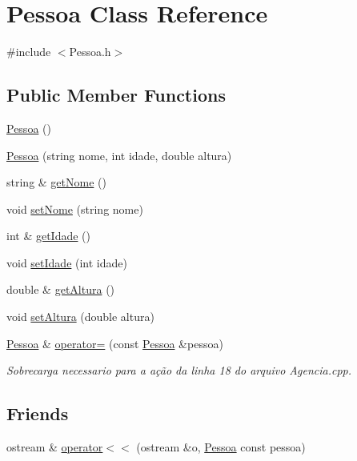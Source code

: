 \hypertarget{classPessoa}{}\section{Pessoa Class Reference}
\label{classPessoa}


{\ttfamily \#include $<$Pessoa.\+h$>$}

\subsection*{Public Member Functions}
\begin{DoxyCompactItemize}
\item 
\hyperlink{classPessoa_a22563fe1f53faa9b1d8d10d28ae0c650}{Pessoa} ()
\item 
\hyperlink{classPessoa_aba44d36855c8ba8f99841bb91feebffd}{Pessoa} (string nome, int idade, double altura)
\item 
string \& \hyperlink{classPessoa_aecf4c8687a96428f134baff162ffd252}{get\+Nome} ()
\item 
void \hyperlink{classPessoa_ab059a835c4aa05bd77dcc58297fca331}{set\+Nome} (string nome)
\item 
int \& \hyperlink{classPessoa_a402a24ffe9a8b8407878031f0661fa2b}{get\+Idade} ()
\item 
void \hyperlink{classPessoa_abccf18c99a7343651f3600f8ccfc688c}{set\+Idade} (int idade)
\item 
double \& \hyperlink{classPessoa_a3a17060aff38808b0dc5b71faac4e99a}{get\+Altura} ()
\item 
void \hyperlink{classPessoa_a53e46a1be984ba0d0c67c23058fa12dd}{set\+Altura} (double altura)
\item 
\hyperlink{classPessoa}{Pessoa} \& \hyperlink{classPessoa_a5032a19d6abe19c097966de909c218d5}{operator=} (const \hyperlink{classPessoa}{Pessoa} \&pessoa)
\begin{DoxyCompactList}\small\item\em Sobrecarga necessario para a ação da linha 18 do arquivo Agencia.\+cpp. \end{DoxyCompactList}\end{DoxyCompactItemize}
\subsection*{Friends}
\begin{DoxyCompactItemize}
\item 
ostream \& \hyperlink{classPessoa_af29a6cc114a72b53647cf81c2a95ed84}{operator$<$$<$} (ostream \&o, \hyperlink{classPessoa}{Pessoa} const pessoa)
\end{DoxyCompactItemize}


